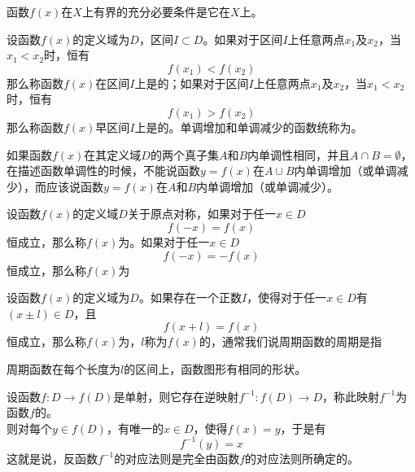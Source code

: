 \documentclass[lang=cn,10pt]{elegantbook}
\begin{document}
\begin{note}
	函数\( f(x) \)在\( X \)上有界的{\heiti 充分必要条件}是它在\( X \)上。
\end{note}

\begin{definition}[函数的单调性]
	设函数\( f(x) \)的定义域为\( D \)，区间\( I \subset D \)。如果对于区间\( I \)上任意两点\( x_{1} \)及\( x_{2} \)，当\( x_{1} < x_{2} \)时，恒有
	\[ f(x_{1}) < f(x_{2}) \]
	那么称函数\( f(x) \)在区间\( I \)上是的；如果对于区间\( I \)上任意两点\( x_{1} \)及\( x_{2} \)，当\( x_{1} < x_{2} \)时，恒有
	\[ f(x_{1}) > f(x_{2}) \]
	那么称函数\( f(x) \)早区间\( I \)上是的。单调增加和单调减少的函数统称为。
\end{definition}

\begin{note}
	如果函数\( f(x) \)在其定义域\( D \)的两个真子集\( A \)和\( B \)内单调性相同，并且\( A \cap B = \emptyset \)，在描述函数单调性的时候，不能说函数\( y=f(x) \)在\( A \cup B \)内单调增加（或单调减少），而应该说函数\( y = f(x) \)在\( A \)和\( B \)内单调增加（或单调减少）。
\end{note}

\begin{definition}[函数的奇偶性]
	设函数\( f(x) \)的定义域\( D \)关于原点对称，如果对于任一\( x \in D \)
	\[ f(-x) = f(x) \]
	恒成立，那么称\( f(x) \)为。如果对于任一\( x \in D \)
	\[ f(-x) = -f(x) \]
	恒成立，那么称\( f(x) \)为
\end{definition}

\begin{definition}[函数的周期性]
	设函数\( f(x) \)的定义域为\( D \)。如果存在一个正数\( I \)，使得对于任一\( x \in D \)有\( (x \pm l) \in D \)，且
	\[ f(x + l) = f(x) \]
	恒成立，那么称\( f(x) \)为，\( l \)称为\( f(x) \)的，通常我们说周期函数的周期是指
\end{definition}

\begin{note}
	周期函数在每个长度为\( l \)的区间上，函数图形有相同的形状。
\end{note}

\begin{definition}[反函数]
	设函数\( f : D \rightarrow f(D) \)是单射，则它存在逆映射\( f^{-1}:f(D) \rightarrow D \)，称此映射\( f ^{-1} \)为函数\( f \)的。\\
	则对每个\( y \in f(D) \)，有唯一的\( x \in D \)，使得\( f(x) = y \)，于是有
	\[ f^{-1}(y) = x \]
	这就是说，反函数\( f^{-1} \)的对应法则是完全由函数\( f \)的对应法则所确定的。
\end{definition}
\end{document}
